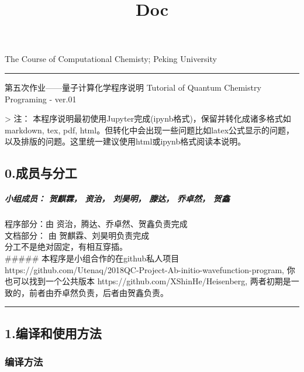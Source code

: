 \documentclass[11pt]{article}
\title{Doc}
\begin{document}
    
    
    \maketitle
    
    

    
    The Course of Computational Chemisty; Peking University

\begin{center}\rule{0.5\linewidth}{\linethickness}\end{center}

第五次作业------量子计算化学程序说明 Tutorial of Quantum Chemistry
Programing - ver.01

 \textgreater{} 注：
本程序说明最初使用Jupyter完成(ipynb格式)，保留并转化成诸多格式如markdown,
tex, pdf,
html。但转化中会出现一些问题比如latex公式显示的问题，以及排版的问题。这里统一建议使用html或ipynb格式阅读本说明。

    \subsection{0.成员与分工}\label{ux6210ux5458ux4e0eux5206ux5de5}

\subparagraph{小组成员： 贺麒霖， 资治， 刘昊明， 滕达， 乔卓然，
贺鑫}\label{ux5c0fux7ec4ux6210ux5458-ux8d3aux9e92ux9716-ux8d44ux6cbb-ux5218ux660aux660e-ux6ed5ux8fbe-ux4e54ux5353ux7136-ux8d3aux946b}

程序部分：由 资治，腾达、乔卓然、贺鑫负责完成\\
文档部分： 由 贺麒霖、刘昊明负责完成\\
分工不是绝对固定，有相互穿插。\\
\#\#\#\#\# 本程序是小组合作的在github私人项目
https://github.com/Utenaq/2018QC-Project-Ab-initio-wavefunction-program,
你也可以找到一个公共版本 https://github.com/XShinHe/Heisenberg,
两者初期是一致的，前者由乔卓然负责，后者由贺鑫负责。

\begin{center}\rule{0.5\linewidth}{\linethickness}\end{center}

    \subsection{1.编译和使用方法}\label{ux7f16ux8bd1ux548cux4f7fux7528ux65b9ux6cd5}

\subsubsection{编译方法}\label{ux7f16ux8bd1ux65b9ux6cd5}
\end{document}
